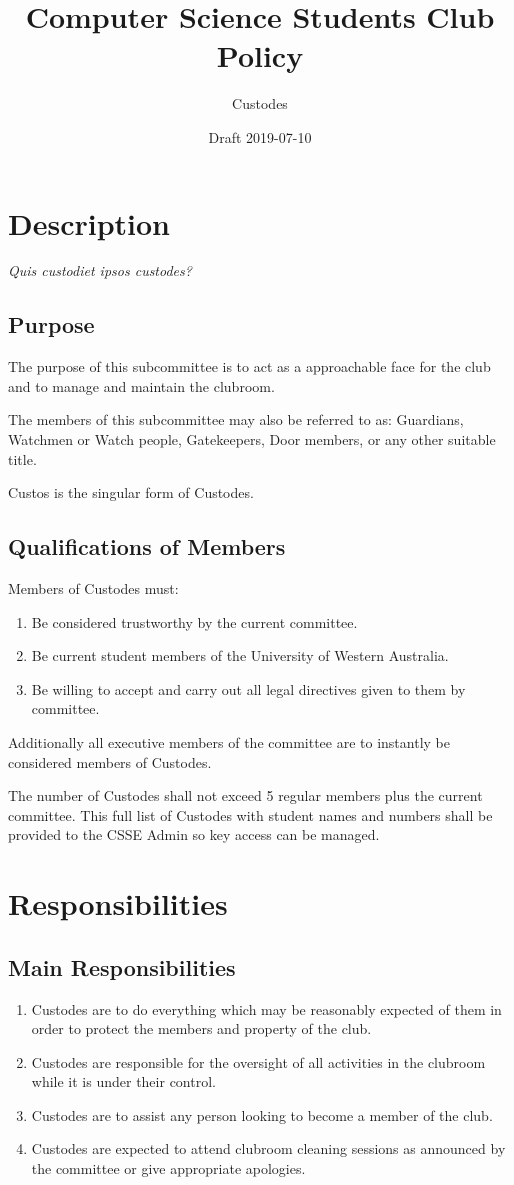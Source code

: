 \documentclass[10pt,a4paper]{report}
\title{Computer Science Students Club Policy}
\author{Custodes}
\date{Draft 2019-07-10}
\begin{document}
	\maketitle
	\newpage
	\begin{small}
		\tableofcontents
	\end{small}
	\newpage
	\chapter{Description}
		\large{\textit{Quis custodiet ipsos custodes?}}
		\section{Purpose}
			The purpose of this subcommittee is to act as a approachable face for the club and to manage and maintain the clubroom.
			
			The members of this subcommittee may also be referred to as: Guardians, Watchmen or Watch people, Gatekeepers, Door members, or any other suitable title.
			
			Custos is the singular form of Custodes.
		\section{Qualifications of Members}
			Members of Custodes must:
			\begin{enumerate}
				\item Be considered trustworthy by the current committee.
				\item Be current student members of the University of Western Australia.
				\item Be willing to accept and carry out all legal directives given to them by committee.
			\end{enumerate}
			Additionally all executive members of the committee are to instantly be considered members of Custodes.
			
			The number of Custodes shall not exceed 5 regular members plus the current committee. This full list of Custodes with student names and numbers shall be provided to the CSSE Admin so key access can be managed.
	\chapter{Responsibilities}
		\section{Main Responsibilities}
		\begin{enumerate}
			\item Custodes are to do everything which may be reasonably expected of them in order to protect the members and property of the club.
			\item Custodes are responsible for the oversight of all activities in the clubroom while it is under their control.
			\item Custodes are to assist any person looking to become a member of the club.
			\item Custodes are expected to attend clubroom cleaning sessions as announced by the committee or give appropriate apologies.
		\end{enumerate}
\end{document}
